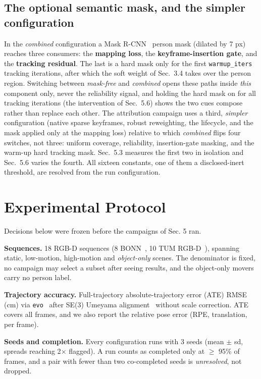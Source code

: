 \subsection{The optional semantic mask, and the simpler configuration}


In the \emph{combined} configuration a Mask R-CNN~\cite{maskrcnn} person mask (dilated by 7 px) reaches three consumers: the \textbf{mapping loss}, the \textbf{keyframe-insertion gate}, and the \textbf{tracking residual}. The last is a hard mask only for the first \texttt{warmup\_iters} tracking iterations, after which the soft weight of Sec.~3.4 takes over the person region. Switching between \emph{mask-free} and \emph{combined} opens these paths inside \emph{this} component only, never the reliability signal, and holding the hard mask on for all tracking iterations (the intervention of Sec.~5.6) shows the two cues compose rather than replace each other. The attribution campaign uses a third, \emph{simpler} configuration (native sparse keyframes, robust reweighting, the lifecycle, and the mask applied only at the mapping loss) relative to which \emph{combined} flips four switches, not three: uniform coverage, reliability, insertion-gate masking, and the warm-up hard tracking mask. Sec.~5.3 measures the first two in isolation and Sec.~5.6 varies the fourth. All sixteen constants, one of them a disclosed-inert threshold, are resolved from the run configuration.




\section{Experimental Protocol}


Decisions below were frozen before the campaigns of Sec. 5 ran.


\textbf{Sequences.} 18 RGB-D sequences (8 BONN~\cite{bonn}, 10 TUM RGB-D~\cite{tumrgbd}), spanning static, low-motion, high-motion and \emph{object-only} scenes. The denominator is fixed, no campaign may select a subset after seeing results, and the object-only movers carry no person label.


\textbf{Trajectory accuracy.} Full-trajectory absolute-trajectory error (ATE) RMSE (cm) via \texttt{evo}~\cite{evo} after SE(3) Umeyama alignment~\cite{umeyama} without scale correction. ATE covers all frames, and we also report the relative pose error (RPE, translation, per frame).


\textbf{Seeds and completion.} Every configuration runs with 3 seeds (mean $\pm$ sd, spreads reaching 2$\times$ flagged). A run counts as completed only at $\ge$ 95\% of frames, and a pair with fewer than two co-completed seeds is \emph{unresolved}, not dropped.


